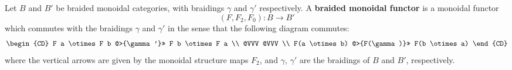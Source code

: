 Let $B$ and $B'$ be braided monoidal categories, with braidings $\gamma$ and $\gamma'$ respectively. A \textbf{braided monoidal functor} is a monoidal functor
$$(F, F_2, F_0) : B \rightarrow B'$$
which commutes with the braidings $\gamma$ and $\gamma'$ in the sense that the following diagram commutes:
\[
\begin{CD}
F a \otimes F b @>{\gamma'}>> F b \otimes F a \\
@VVV @VVV \\
F(a \otimes b) @>{F(\gamma)}>> F(b \otimes a)
\end{CD}
\]
where the vertical arrows are given by the monoidal structure maps $F_2$, and $\gamma$, $\gamma'$ are the braidings of $B$ and $B'$, respectively.
